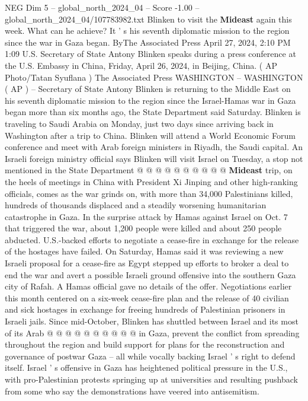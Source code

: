 \begin{textsample}{NEG Dim 5 – global\_north\_2024\_04 – Score -1.00 – global\_north\_2024\_04/107783982.txt}  \label{ex:f5_neg_198}
Blinken to visit the \textbf{Mideast} again this week.
What can he achieve?
It ' s his seventh diplomatic mission to the region since the war in Gaza began.
ByThe Associated Press April 27, 2024, 2:10 PM 1:09 U.S.
Secretary of State Antony Blinken speaks during a press conference at the U.S.
Embassy in China, Friday, April 26, 2024, in Beijing, China. ( AP Photo/Tatan Syuflana ) The Associated Press WASHINGTON -- WASHINGTON ( AP ) -- Secretary of State Antony Blinken is returning to the Middle East on his seventh diplomatic mission to the region since the Israel-Hamas war in Gaza began more than six months ago, the State Department said Saturday.
Blinken is traveling to Saudi Arabia on Monday, just two days since arriving back in Washington after a trip to China.
Blinken will attend a World Economic Forum conference and meet with Arab foreign ministers in Riyadh, the Saudi capital.
An Israeli foreign ministry official says Blinken will visit Israel on Tuesday, a stop not mentioned in the State Department @ @ @ @ @ @ @ @ @ @ \textbf{Mideast} trip, on the heels of meetings in China with President Xi Jinping and other high-ranking officials, comes as the war grinds on, with more than 34,000 Palestinians killed, hundreds of thousands displaced and a steadily worsening humanitarian catastrophe in Gaza.
In the surprise attack by Hamas against Israel on Oct. 7 that triggered the war, about 1,200 people were killed and about 250 people abducted.
U.S.-backed efforts to negotiate a cease-fire in exchange for the release of the hostages have failed.
On Saturday, Hamas said it was reviewing a new Israeli proposal for a cease-fire as Egypt stepped up efforts to broker a deal to end the war and avert a possible Israeli ground offensive into the southern Gaza city of Rafah.
A Hamas official gave no details of the offer.
Negotiations earlier this month centered on a six-week cease-fire plan and the release of 40 civilian and sick hostages in exchange for freeing hundreds of Palestinian prisoners in Israeli jails.
Since mid-October, Blinken has shuttled between Israel and its most of its Arab @ @ @ @ @ @ @ @ @ @ in Gaza, prevent the conflict from spreading throughout the region and build support for plans for the reconstruction and governance of postwar Gaza -- all while vocally backing Israel ' s right to defend itself.
Israel ' s offensive in Gaza has heightened political pressure in the U.S., with pro-Palestinian protests springing up at universities and resulting pushback from some who say the demonstrations have veered into antisemitism.

\end{textsample}
